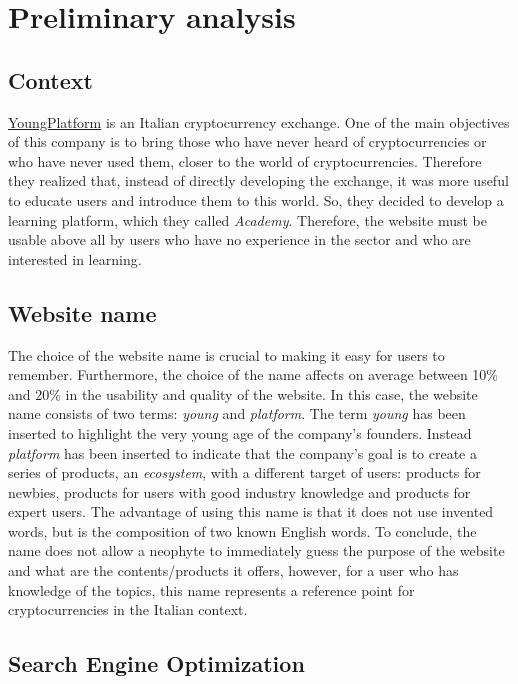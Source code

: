 \section{Preliminary analysis}

\subsection{Context}

\href{https://youngplatform.com}{YoungPlatform} is an Italian cryptocurrency 
exchange. One of the main objectives of this company is to bring those who 
have never heard of cryptocurrencies or who have never used them, closer to 
the world of cryptocurrencies. Therefore they realized that, instead of 
directly developing the exchange, it was more useful to educate users and 
introduce them to this world. So, they decided to develop a learning 
platform, which they called \textit{Academy}. Therefore, the website must 
be usable above all by users who have no experience in the sector and who 
are interested in learning.

\subsection{Website name}

The choice of the website name is crucial to making it easy for users to 
remember. Furthermore, the choice of the name affects on average between 
10\% and 20\% in the usability and quality of the website. In this case, 
the website name consists of two terms: \textit{young} and 
\textit{platform}. The term \textit{young} has been inserted to highlight 
the very young age of the company's founders. Instead \textit{platform} 
has been inserted to indicate that the company's goal is to create a 
series of products, an \textit{ecosystem}, with a different target of 
users: products for newbies, products for users with good industry 
knowledge and products for expert users. The advantage of using this 
name is that it does not use invented words, but is the composition of 
two known English words. To conclude, the name does not allow a 
neophyte to immediately guess the purpose of the website and what are 
the contents/products it offers, however, for a user who has knowledge 
of the topics, this name represents a reference point for cryptocurrencies 
in the Italian context.

\subsection{Search Engine Optimization}

